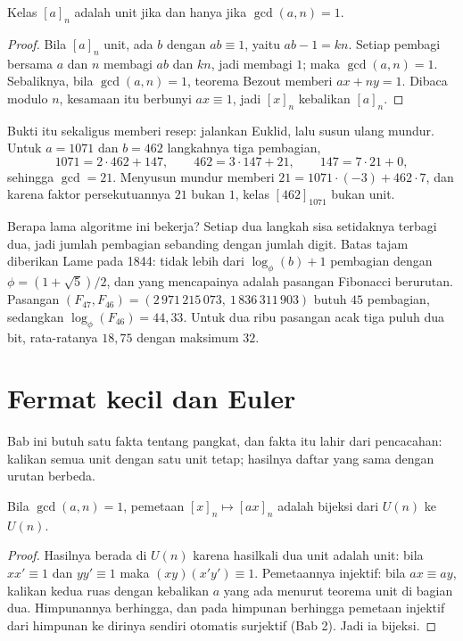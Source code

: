 \begin{teorema}
Kelas $[a]_n$ adalah unit jika dan hanya jika $\gcd(a,n)=1$.
\end{teorema}

\begin{proof}
Bila $[a]_n$ unit, ada $b$ dengan $ab\equiv1$, yaitu $ab-1=kn$. Setiap pembagi bersama $a$ dan
$n$ membagi $ab$ dan $kn$, jadi membagi $1$; maka $\gcd(a,n)=1$. Sebaliknya, bila
$\gcd(a,n)=1$, teorema Bezout memberi $ax+ny=1$. Dibaca modulo $n$, kesamaan itu berbunyi
$ax\equiv1$, jadi $[x]_n$ kebalikan $[a]_n$.
\end{proof}

Bukti itu sekaligus memberi resep: jalankan Euklid, lalu susun ulang mundur. Untuk $a=1071$ dan
$b=462$ langkahnya tiga pembagian,
\[
1071=2\cdot462+147,\qquad 462=3\cdot147+21,\qquad 147=7\cdot21+0,
\]
sehingga $\gcd=21$. Menyusun mundur memberi $21=1071\cdot(-3)+462\cdot7$, dan karena faktor
persekutuannya $21$ bukan $1$, kelas $[462]_{1071}$ bukan unit.

Berapa lama algoritme ini bekerja? Setiap dua langkah sisa setidaknya terbagi dua, jadi jumlah
pembagian sebanding dengan jumlah digit. Batas tajam diberikan Lame pada 1844: tidak lebih dari
$\log_\phi(b)+1$ pembagian dengan $\phi=(1+\sqrt5)/2$, dan yang mencapainya adalah pasangan
Fibonacci berurutan. Pasangan $(F_{47},F_{46})=(2\,971\,215\,073,\ 1\,836\,311\,903)$ butuh
$45$ pembagian, sedangkan $\log_\phi(F_{46})=44{,}33$. Untuk dua ribu pasangan acak tiga puluh
dua bit, rata-ratanya $18{,}75$ dengan maksimum $32$.


\section{Fermat kecil dan Euler}

Bab ini butuh satu fakta tentang pangkat, dan fakta itu lahir dari pencacahan: kalikan semua
unit dengan satu unit tetap; hasilnya daftar yang sama dengan urutan berbeda.

\begin{lemma}
Bila $\gcd(a,n)=1$, pemetaan $[x]_n\mapsto[ax]_n$ adalah bijeksi dari $U(n)$ ke $U(n)$.
\end{lemma}

\begin{proof}
Hasilnya berada di $U(n)$ karena hasilkali dua unit adalah unit: bila $xx'\equiv1$ dan
$yy'\equiv1$ maka $(xy)(x'y')\equiv1$. Pemetaannya injektif: bila $ax\equiv ay$, kalikan kedua
ruas dengan kebalikan $a$ yang ada menurut teorema unit di bagian dua. Himpunannya berhingga,
dan pada himpunan berhingga pemetaan injektif dari himpunan ke dirinya sendiri otomatis
surjektif (Bab 2). Jadi ia bijeksi.
\end{proof}

